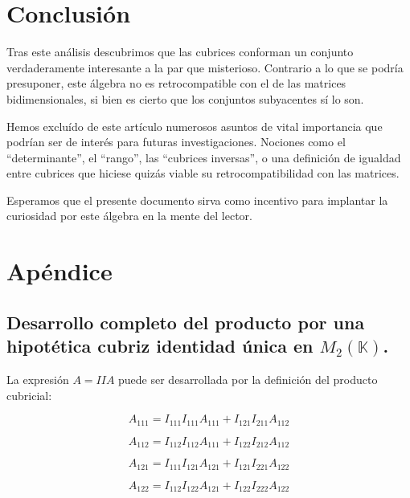 \documentclass[a4paper, titlepage]{article}
\begin{document}
\section{Conclusión}

Tras este análisis descubrimos que las cubrices conforman un conjunto verdaderamente interesante a la par que misterioso. Contrario a lo que se podría presuponer, este álgebra no es retrocompatible con el de las matrices bidimensionales, si bien es cierto que los conjuntos subyacentes sí lo son.

Hemos excluído de este artículo numerosos asuntos de vital importancia que podrían ser de interés para futuras investigaciones. Nociones como el ``determinante'', el ``rango'', las ``cubrices inversas'', o una definición de igualdad entre cubrices que hiciese quizás viable su retrocompatibilidad con las matrices.

Esperamos que el presente documento sirva como incentivo para implantar la curiosidad por este álgebra en la mente del lector.

\newpage
\appendix

\section{Apéndice}

\subsection{Desarrollo completo del producto por una hipotética cubriz identidad única en $M_2 (\mathbb{K})$.}

La expresión $A = IIA$ puede ser desarrollada por la definición del producto cubricial:

\begin{equation}
A_{111} = I_{111} I_{111} A_{111} + I_{121} I_{211} A_{112}
\end{equation}

\begin{equation}
A_{112} = I_{112} I_{112} A_{111} + I_{122} I_{212} A_{112}
\end{equation}

\begin{equation}
A_{121} = I_{111} I_{121} A_{121} + I_{121} I_{221} A_{122}
\end{equation}

\begin{equation}
A_{122} = I_{112} I_{122} A_{121} + I_{122} I_{222} A_{122}
\end{equation}
\end{document}
